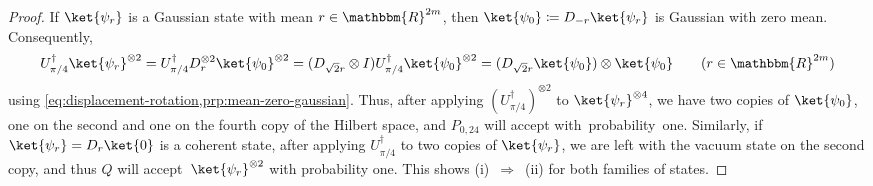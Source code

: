 \documentclass[11pt,a4paper]{article}
\numberwithin{equation}{section}
\newcommand{\ot}{\otimes}
\newcommand{\RR}{\mathbbm{R}}
\newcommand{\1}{\mathbf{1}}
\begin{document}
\begin{proof}
    If $\ket{\psi_r}$ is a Gaussian state with mean $r \in \RR^{2m}$, then $\ket{\psi_0} \coloneqq D_{-r} \ket{\psi_r}$ is Gaussian with zero mean.
    Consequently,
    \begin{align*}
        U_{\pi/4}^\dagger \ket{\psi_r}^{\ot 2} = U_{\pi/4}^\dagger D_r^{\ot 2} \ket{\psi_0}^{\ot 2} = (D_{\sqrt2 r} \ot I) U_{\pi/4}^\dagger \ket{\psi_0}^{\ot 2} = (D_{\sqrt2 r} \ket{\psi_0}) \ot \ket{\psi_0}
        \qquad (r \in \RR^{2m})
    \end{align*}
    using \cref{eq:displacement-rotation,prp:mean-zero-gaussian}.
    Thus, after applying $(U^\dagger_{\pi/4})^{\ot 2}$ to $\ket{\psi_r}^{\ot 4}$, we have two copies of $\ket{\psi_0}$, one on the second and one on the fourth copy of the Hilbert space, and $P_{0,24}$ will accept with~probability~one.
    Similarly, if $\ket{\psi_r} = D_r \ket{0}$ is a coherent state, after applying $U_{\pi/4}^\dagger$ to two copies of $\ket{\psi_r}$, we are left with the vacuum state on the second copy, and thus $Q$ will accept~$\ket{\psi_r}^{\ot 2}$ with probability one.
    This shows (i)~$\Rightarrow$~(ii) for both families of states.


\end{proof}
\end{document}
